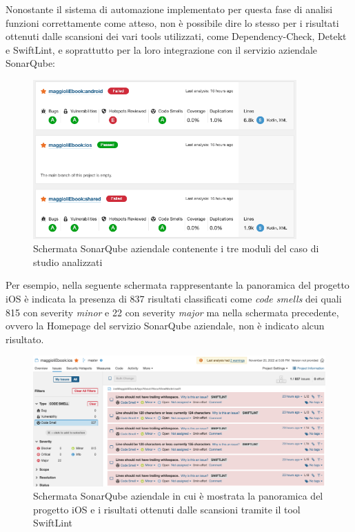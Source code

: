 Nonostante il sistema di automazione implementato per questa fase di analisi funzioni correttamente come atteso, non è possibile dire lo stesso per i risultati ottenuti dalle scansioni dei vari tools utilizzati, come Dependency-Check, Detekt e SwiftLint, e soprattutto per la loro integrazione con il servizio aziendale SonarQube:

\begin{figure}[H]
\centering
    \includegraphics[width=0.9\textwidth]{img/sonarqube-kmm.png}
    \caption{Schermata SonarQube aziendale contenente i tre moduli del caso di studio analizzati}
    \label{sonarqube-kmm}
\end{figure}

Per esempio, nella seguente schermata rappresentante la panoramica del progetto iOS è indicata la presenza di 837 risultati classificati come \textit{code smells} dei quali 815 con severity \textit{minor} e 22 con severity \textit{major} ma nella schermata precedente, ovvero la Homepage del servizio SonarQube aziendale, non è indicato alcun risultato.

\begin{figure}[H]
\centering
    \includegraphics[width=1\textwidth]{img/sonarqube-ios.png}
    \caption{Schermata SonarQube aziendale in cui è mostrata la panoramica del progetto iOS e i risultati ottenuti dalle scansioni tramite il tool SwiftLint}
    \label{sonarqube-ios}
\end{figure}

